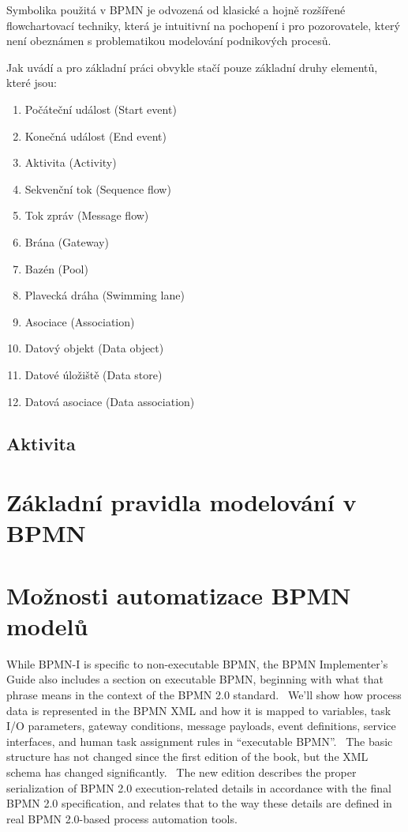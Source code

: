 \documentclass[]{article}
\begin{document}
Symbolika použitá v BPMN je odvozená od klasické a hojně rozšířené flowchartovací techniky, která je intuitivní na pochopení i pro pozorovatele, který není obeznámen s problematikou modelování podnikových procesů.

Jak uvádí \cite{Silver2011} a \cite{Vasicek2008} pro základní práci obvykle stačí pouze základní druhy elementů, které jsou:

\begin{enumerate}
\item Počáteční událost (Start event)
\item Konečná událost (End event)
\item Aktivita (Activity)
\item Sekvenční tok (Sequence flow)
\item Tok zpráv (Message flow)
\item Brána (Gateway)
\item Bazén (Pool)
\item Plavecká dráha (Swimming lane)
\item Asociace (Association)
\item Datový objekt (Data object)
\item Datové úložiště (Data store)
\item Datová asociace (Data association)
\end{enumerate}

\subsection{Aktivita}


\section{Základní pravidla modelování v BPMN}


\section{Možnosti automatizace BPMN modelů}

While BPMN-I is specific to non-executable BPMN, the BPMN Implementer’s Guide also includes a section on executable BPMN, beginning with what that phrase means in the context of the BPMN 2.0 standard.  We’ll show how process data is represented in the BPMN XML and how it is mapped to variables, task I/O parameters, gateway conditions, message payloads, event definitions, service interfaces, and human task assignment rules in “executable BPMN”.  The basic structure has not changed since the first edition of the book, but the XML schema has changed significantly.  The new edition describes the proper serialization of BPMN 2.0 execution-related details in accordance with the final BPMN 2.0 specification, and relates that to the way these details are defined in real BPMN 2.0-based process automation tools.
\end{document}
